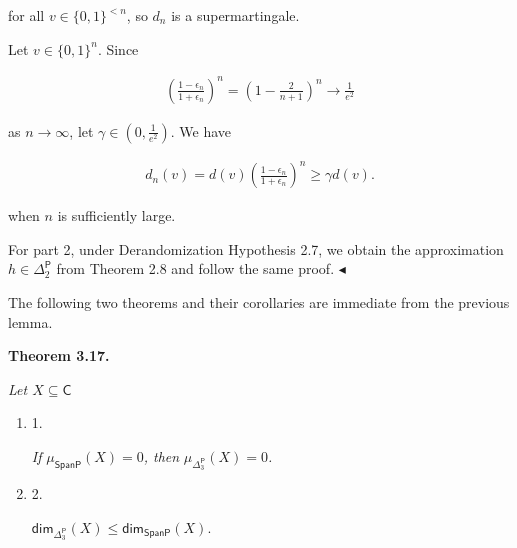 \documentclass[10pt,a4paper]{article}
\begin{document}
for all $v\in\{0,1\}^{<n}$, so $d_{n}$ is a supermartingale.\par




Let $v\in\{0,1\}^{n}$. Since\par


\[\begin{gathered}
\left(\frac{1-\epsilon_{n}}{1+\epsilon_{n}}\right)^{n}=\left(1-\frac{2}{n+1}\right)^{n}\to\frac{1}{e^{2}}
\end{gathered}\]


as $n\to\infty$, let $\gamma\in(0,\tfrac{1}{e^{2}})$.
We have\par


\[\begin{gathered}
d_{n}(v)=d(v)\left(\frac{1-\epsilon_{n}}{1+\epsilon_{n}}\right)^{n}\geq\gamma d(v).
\end{gathered}\]


when $n$ is sufficiently large.\par




For part 2, under Derandomization Hypothesis 2.7, we obtain the approximation $h\in{\Delta^{\mathsf{P}}_{2}}$ from Theorem 2.8 and follow the same proof.
$\blacktriangleleft$\par




The following two theorems and their corollaries are immediate from the previous lemma.\par





\par\medskip\noindent\textbf{
\textbf{Theorem 3.17}\textbf{.}
}\par



\emph{Let $X\subseteq\mathsf{C}$}\par


\begin{enumerate}


\item[] 
1. 


\emph{If }$\mu_{\mathsf{SpanP}}(X)=0$\emph{, then }$\mu_{\Delta^{\mathsf{P}}_{3}}(X)=0$\emph{.}\par





\item[] 
2. 


${\mathsf{dim}}_{\Delta^{\mathsf{P}}_{3}}(X)\leq{\mathsf{dim}}_{\mathsf{SpanP}}(X).$\emph{}\par





\end{enumerate}
\end{document}
